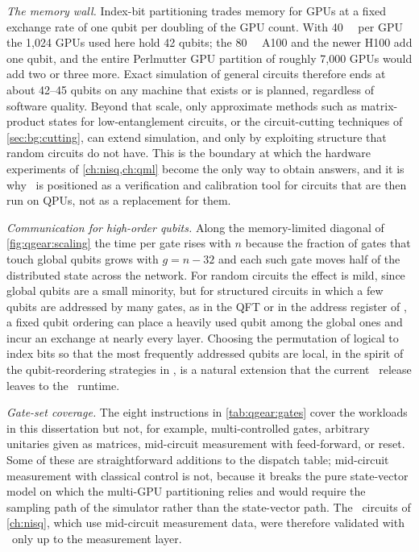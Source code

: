 \emph{The memory wall.} Index-bit partitioning trades memory for GPUs at a fixed exchange rate of one qubit per doubling of the GPU count. With \SI{40}{\giga\byte} per GPU the 1,024 GPUs used here hold 42 qubits; the \SI{80}{\giga\byte} A100 and the newer H100 add one qubit, and the entire Perlmutter GPU partition of roughly 7,000 GPUs would add two or three more. Exact simulation of general circuits therefore ends at about 42--45 qubits on any machine that exists or is planned, regardless of software quality. Beyond that scale, only approximate methods such as matrix-product states \cite{perezgarcia2006mps} for low-entanglement circuits, or the circuit-cutting techniques of \cref{sec:bg:cutting}, can extend simulation, and only by exploiting structure that random circuits do not have. This is the boundary at which the hardware experiments of \cref{ch:nisq,ch:qml} become the only way to obtain answers, and it is why \qgear\ is positioned as a verification and calibration tool for circuits that are then run on QPUs, not as a replacement for them.

\emph{Communication for high-order qubits.} Along the memory-limited diagonal of \cref{fig:qgear:scaling} the time per gate rises with $n$ because the fraction of gates that touch global qubits grows with $g=n-32$ and each such gate moves half of the distributed state across the network. For random circuits the effect is mild, since global qubits are a small minority, but for structured circuits in which a few qubits are addressed by many gates, as in the QFT or in the address register of \qcrank, a fixed qubit ordering can place a heavily used qubit among the global ones and incur an exchange at nearly every layer. Choosing the permutation of logical to index bits so that the most frequently addressed qubits are local, in the spirit of the qubit-reordering strategies in \cite{bayraktar2023cuquantum,doi2023multishotgpu}, is a natural extension that the current \qgear\ release leaves to the \cudaq\ runtime.

\emph{Gate-set coverage.} The eight instructions in \cref{tab:qgear:gates} cover the workloads in this dissertation but not, for example, multi-controlled gates, arbitrary unitaries given as matrices, mid-circuit measurement with feed-forward, or reset. Some of these are straightforward additions to the dispatch table; mid-circuit measurement with classical control is not, because it breaks the pure state-vector model on which the multi-GPU partitioning relies and would require the sampling path of the simulator rather than the state-vector path. The \qawa\ circuits of \cref{ch:nisq}, which use mid-circuit measurement data, were therefore validated with \qgear\ only up to the measurement layer.

